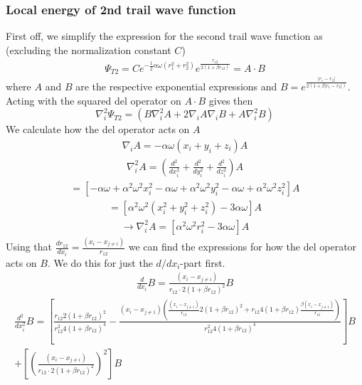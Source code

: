 \documentclass[12pt,english,a4paper]{article}
\begin{document}
\subsubsection{Local energy of 2nd trail wave function} \label{section:appendix:calculations:energies}
First off, we simplify the expression for the second trail wave function as (excluding the normalization constant $C$)
\begin{align*}
    \Psi_{T2}=Ce^{-\frac{1}{2}\alpha\omega(r_1^2+r_2^2)}e^{\frac{r_{12}}{2(1+\beta r_{12})}}=A\cdot B
\end{align*}
where $A$ and $B$ are the respective exponential expressions and $B=e^{\frac{|r_1-r_2|}{2(1+\beta |r_1-r_2|)}}$. Acting with the squared del operator on $A\cdot B$ gives then
\begin{equation}
    \nabla_i^2\Psi_{T2}=\left(B\nabla_i^2A+2\nabla_iA\nabla_iB+A\nabla_i^2B\right)
    \label{eq:double_deriv}
\end{equation}
We calculate how the del operator acts on $A$
\begin{align*}
    \nabla_iA = -\alpha\omega \left(x_i+y_i+z_i\right)A
\end{align*}
\begin{align*}
    \nabla_i^2A = \left(\frac{d^2}{dx_i^2}+\frac{d^2}{dy_i^2}+\frac{d^2}{dz_i^2}\right)A
\end{align*}
\begin{align*}
    = \left[-\alpha\omega+\alpha^2\omega^2x_i^2-\alpha\omega+\alpha^2\omega^2y_i^2-\alpha\omega+\alpha^2\omega^2z_i^2\right]A
\end{align*}
\begin{align*}
    = \left[\alpha^2\omega^2\left(x_i^2+y_i^2+z_i^2\right)-3\alpha\omega\right]A
\end{align*}
\begin{align*}
    \rightarrow \nabla_i^2A = \left[\alpha^2\omega^2r_i^2-3\alpha\omega\right]A
\end{align*}
Using that $\frac{dr_{12}}{dx_i}=\frac{\left(x_i-x_{j\ne i}\right)}{r_{12}}$ we can find the expressions for how the del operator acts on $B$. We do this for just the $d/dx_i$-part first.
\begin{align*}
    \frac{d}{dx_i}B = \frac{\left(x_i-x_{j\ne i}\right)}{r_{12}\cdot 2\left(1+\beta r_{12}\right)^2}B
\end{align*}
\begin{align*}
    \frac{d^2}{dx_i^2} B = \left[\frac{r_{12}2\left(1+\beta r_{12}\right)^2}{r_{12}^2 4\left(1+\beta r_{12}\right)^4}-\frac{\left(x_i-x_{j\ne 1}\right)\left(\frac{\left(x_i-x_{j\ne 1}\right)}{r_{12}}2\left(1+\beta r_{12}\right)^2+r_{12}4\left(1+\beta r_{12}\right)\frac{\beta\left(x_i-x_{j\ne 1}\right)}{r_{12}}\right)}{r_{12}^2 4\left(1+\beta r_{12}\right)^4}\right]B\\
    +\left[\left(\frac{\left(x_i-x_{j\ne i}\right)}{r_{12}\cdot 2\left(1+\beta r_{12}\right)^2}\right)^2\right]B
\end{align*}
\end{document}
